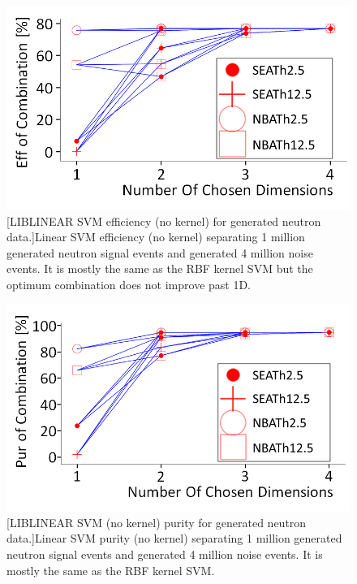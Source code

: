 \begin{figure}[!h]
\centering
\begin{minipage}{.45\textwidth}
  \centering
  \includegraphics[width=\linewidth]{Appendix1/Figs/effLinCombSVMAdjustMedText.png}
  [LIBLINEAR SVM efficiency (no kernel) for generated neutron data.]{Linear SVM efficiency (no kernel) separating 1 million generated neutron signal events and generated 4 million noise events. It is mostly the same as the RBF kernel SVM but the optimum combination does not improve past 1D.} 
  \label{fig:effLinCombSVMAdjustMedText}
\end{minipage}%
\qquad
\begin{minipage}{.45\textwidth}
  \centering
  \includegraphics[width=\linewidth]{Appendix1/Figs/purLinCombSVMAdjustMedText.png}
  [LIBLINEAR SVM (no kernel) purity for generated neutron data.]{Linear SVM purity (no kernel) separating 1 million generated neutron signal events and generated 4 million noise events. It is mostly the same as the RBF kernel SVM.}
  \label{fig:purLinCombSVMAdjustMedText}
  \vspace{0.956cm} %
\end{minipage}
\end{figure}

